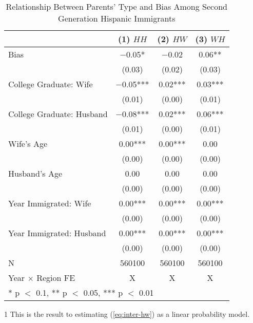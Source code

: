 \begin{table}[H]

\caption{Relationship Between Parents' Type and Bias Among Second Generation Hispanic Immigrants\label{regtab-skin-iat-parents-type}}
\centering
\begin{threeparttable}
\begin{tabular}[t]{lccc}
\toprule
  & \specialcell{(1) \\ $HH$} & \specialcell{(2) \\ $HW$} & \specialcell{(3) \\ $WH$}\\
\midrule
Bias & \num{-0.05}* & \num{-0.02} & \num{0.06}**\\
 & (\num{0.03}) & (\num{0.02}) & (\num{0.03})\\
College Graduate: Wife & \num{-0.05}*** & \num{0.02}*** & \num{0.03}***\\
 & (\num{0.01}) & (\num{0.00}) & \vphantom{1} (\num{0.01})\\
College Graduate: Husband & \num{-0.08}*** & \num{0.02}*** & \num{0.06}***\\
 & (\num{0.01}) & (\num{0.00}) & (\num{0.01})\\
Wife's Age & \num{0.00}*** & \num{0.00}*** & \num{0.00}\\
 & (\num{0.00}) & (\num{0.00}) & \vphantom{3} (\num{0.00})\\
Husband's Age & \num{0.00} & \num{0.00} & \num{0.00}\\
 & (\num{0.00}) & (\num{0.00}) & \vphantom{2} (\num{0.00})\\
Year Immigrated: Wife & \num{0.00}*** & \num{0.00}*** & \num{0.00}***\\
 & (\num{0.00}) & (\num{0.00}) & \vphantom{1} (\num{0.00})\\
Year Immigrated: Husband & \num{0.00}*** & \num{0.00}*** & \num{0.00}***\\
 & (\num{0.00}) & (\num{0.00}) & (\num{0.00})\\
\midrule
N & \num{560100} & \num{560100} & \num{560100}\\
Year $\times$ Region FE & X & X & X\\
\bottomrule
\multicolumn{4}{l}{\rule{0pt}{1em}* p $<$ 0.1, ** p $<$ 0.05, *** p $<$ 0.01}\\
\end{tabular}
\begin{tablenotes}
\small
\item[1] \footnotesize{This is the result to estimating (\ref{eq:inter-hw}) as a
                      linear probability model.}

\end{tablenotes}
\end{threeparttable}
\end{table}
